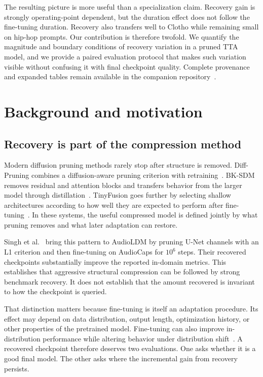 \documentclass{article}
\begin{document}
The resulting picture is more useful than a specialization claim. Recovery gain is strongly operating-point dependent, but the duration effect does not follow the fine-tuning duration. Recovery also transfers well to Clotho while remaining small on hip-hop prompts. Our contribution is therefore twofold. We quantify the magnitude and boundary conditions of recovery variation in a pruned TTA model, and we provide a paired evaluation protocol that makes such variation visible without confusing it with final checkpoint quality. Complete provenance and expanded tables remain available in the companion repository~\cite{bibbo2026repo}.

\section{Background and motivation}
\subsection{Recovery is part of the compression method}
Modern diffusion pruning methods rarely stop after structure is removed. Diff-Pruning combines a diffusion-aware pruning criterion with retraining~\cite{fang2023diffpruning}. BK-SDM removes residual and attention blocks and transfers behavior from the larger model through distillation~\cite{kim2024bksdm}. TinyFusion goes further by selecting shallow architectures according to how well they are expected to perform after fine-tuning~\cite{fang2025tinyfusion}. In these systems, the useful compressed model is defined jointly by what pruning removes and what later adaptation can restore.

Singh et al.~\cite{singh2026pruning} bring this pattern to AudioLDM by pruning U-Net channels with an L1 criterion and then fine-tuning on AudioCaps for $10^{6}$ steps. Their recovered checkpoints substantially improve the reported in-domain metrics. This establishes that aggressive structural compression can be followed by strong benchmark recovery. It does not establish that the amount recovered is invariant to how the checkpoint is queried.

That distinction matters because fine-tuning is itself an adaptation procedure. Its effect may depend on data distribution, output length, optimization history, or other properties of the pretrained model. Fine-tuning can also improve in-distribution performance while altering behavior under distribution shift~\cite{kumar2022finetuning}. A recovered checkpoint therefore deserves two evaluations. One asks whether it is a good final model. The other asks where the incremental gain from recovery persists.
\end{document}
